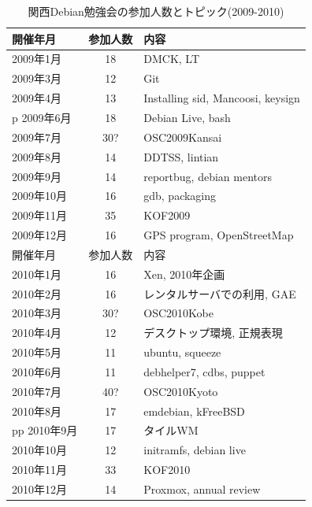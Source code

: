 \documentclass[mingoth,a4paper]{jsarticle}
\begin{document}
\begin{table}
  \pagebreak
  \begin{minipage}{.5\linewidth}
    \begin{center}
      \caption{関西Debian勉強会の参加人数とトピック(2009-2010)}
      \begin{tabular}{|l|c|p{10em}|}
        \hline
        開催年月   & 参加人数 & 内容 \\
        \hline
        2009年1月  & 18       & DMCK, LT \\
        2009年3月  & 12       & Git \\
        2009年4月  & 13       & Installing sid, Mancoosi, keysign \\
p        2009年6月  & 18       & Debian Live, bash\\
        2009年7月  & 30?      & OSC2009Kansai \\
        2009年8月  & 14       & DDTSS, lintian \\
        2009年9月  & 14       & reportbug, debian mentors\\
        2009年10月 & 16       & gdb, packaging \\
        2009年11月 & 35       & KOF2009 \\
        2009年12月 & 16       & GPS program, OpenStreetMap \\
        \hline
        \hline
        開催年月   & 参加人数 & 内容 \\
        \hline
        2010年1月  & 16       & Xen, 2010年企画 \\
        2010年2月  & 16       & レンタルサーバでの利用, GAE \\
        2010年3月  & 30?      & OSC2010Kobe \\
        2010年4月  & 12       & デスクトップ環境, 正規表現 \\
        2010年5月  & 11       & ubuntu, squeeze \\
        2010年6月  & 11       & debhelper7, cdbs, puppet \\
        2010年7月  & 40?      & OSC2010Kyoto \\
        2010年8月  & 17       & emdebian, kFreeBSD \\pp
        2010年9月  & 17       & タイルWM \\
        2010年10月 & 12       & initramfs, debian live \\
        2010年11月 & 33       & KOF2010 \\
        2010年12月 & 14       & Proxmox, annual review \\
        \hline
      \end{tabular}
    \end{center}
  \end{minipage}
\end{table}
\end{document}
